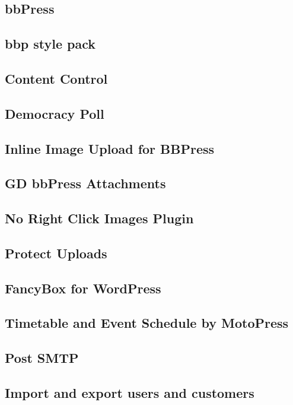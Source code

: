 \documentclass[titlepage,10pt,a4paper,uplatex]{jsbook}
\begin{document}
\subsection{bbPress}

\subsection{bbp style pack}

\subsection{Content Control}

\subsection{Democracy Poll}

\subsection{Inline Image Upload for BBPress}

\subsection{GD bbPress Attachments}

\subsection{No Right Click Images Plugin}

\subsection{Protect Uploads}

\subsection{FancyBox for WordPress}

\subsection{Timetable and Event Schedule by MotoPress}

\subsection{Post SMTP}

\subsection{Import and export users and customers}
\end{document}
